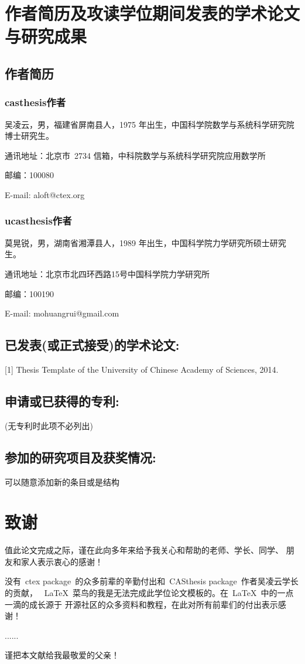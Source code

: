 


\chapter{作者简历及攻读学位期间发表的学术论文与研究成果}

\section*{作者简历}

\subsection*{casthesis作者}

吴凌云，男，福建省屏南县人，1975 年出生，中国科学院数学与系统科学研究院博士研究生。

通讯地址：北京市~2734 信箱，中科院数学与系统科学研究院应用数学所

邮编：100080

E-mail: aloft@ctex.org

\subsection*{ucasthesis作者}

莫晃锐，男，湖南省湘潭县人，1989 年出生，中国科学院力学研究所硕士研究生。

通讯地址：北京市北四环西路15号中国科学院力学研究所

邮编：100190

E-mail: mohuangrui@gmail.com

\section*{已发表(或正式接受)的学术论文:}

[1] Thesis Template of the University of Chinese Academy of Sciences, 2014.

\section*{申请或已获得的专利:}

(无专利时此项不必列出)

\section*{参加的研究项目及获奖情况:}

可以随意添加新的条目或是结构

\chapter{致\quad 谢}

值此论文完成之际，谨在此向多年来给予我关心和帮助的老师、学长、同学、
朋友和家人表示衷心的感谢！

没有~ctex package~的众多前辈的辛勤付出和~CASthesis package~作者吴凌云学长的贡献，
~\LaTeX{}~菜鸟的我是无法完成此学位论文模板的。在~\LaTeX{}~中的一点一滴的成长源于
开源社区的众多资料和教程，在此对所有前辈们的付出表示感谢！

......

谨把本文献给我最敬爱的父亲！

